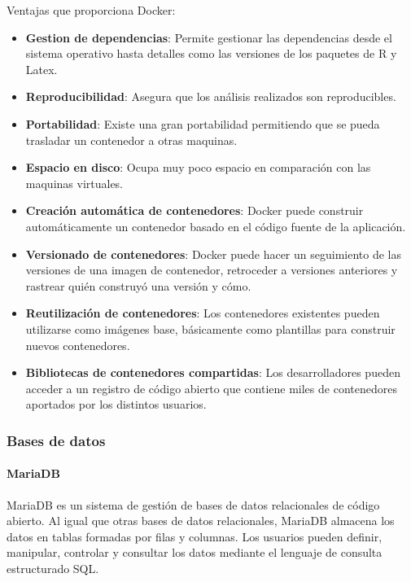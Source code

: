 \documentclass[../../main.tex]{subfiles}
\begin{document}
Ventajas que proporciona Docker:
\begin{itemize}
    \item \textbf{Gestion de dependencias}: Permite gestionar las dependencias desde el sistema operativo hasta detalles como las versiones de los paquetes de R y Latex.
    
    \item \textbf{Reproducibilidad}: Asegura que los análisis realizados son reproducibles.
    
    \item \textbf{Portabilidad}: Existe una gran portabilidad permitiendo que se pueda trasladar un contenedor a otras maquinas.
    
    \item \textbf{Espacio en disco}: Ocupa muy poco espacio en comparación con las maquinas virtuales.
    
    \item \textbf{Creación automática de contenedores}: Docker puede construir automáticamente un contenedor basado en el código fuente de la aplicación.
    
    \item \textbf{Versionado de contenedores}: Docker puede hacer un seguimiento de las versiones de una imagen de contenedor, retroceder a versiones anteriores y rastrear quién construyó una versión y cómo.
    
    \item \textbf{Reutilización de contenedores}: Los contenedores existentes pueden utilizarse como imágenes base, básicamente como plantillas para construir nuevos contenedores.
    
    \item \textbf{Bibliotecas de contenedores compartidas}: Los desarrolladores pueden acceder a un registro de código abierto que contiene miles de contenedores aportados por los distintos usuarios.
\end{itemize}
\newpage
\cleardoublepage


\subsubsection{Bases de datos}
\paragraph{MariaDB}
MariaDB\cite{doc11} es un sistema de gestión de bases de datos relacionales de código abierto. Al igual que otras bases de datos relacionales, MariaDB almacena los datos en tablas formadas por filas y columnas. Los usuarios pueden definir, manipular, controlar y consultar los datos mediante el lenguaje de consulta estructurado SQL.
\end{document}
